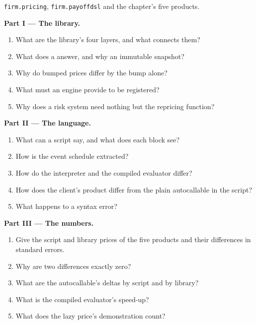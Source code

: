 \begin{problem}\label{pb:pl:pricing-library-architecture:1}
\texttt{firm.pricing}, \texttt{firm.payoffdsl} and the chapter's five products.

\medskip\noindent\textbf{Part I --- The library.}
\begin{enumerate}
\item What are the library's four layers, and what connects them?
\item What does a  answer, and why an immutable snapshot?
\item Why do bumped prices differ by the bump alone?
\item What must an engine provide to be registered?
\item Why does a risk system need nothing but the repricing function?
\end{enumerate}

\medskip\noindent\textbf{Part II --- The language.}
\begin{enumerate}[resume]
\item What can a script say, and what does each block see?
\item How is the event schedule extracted?
\item How do the interpreter and the compiled evaluator differ?
\item How does the client's product differ from the plain autocallable in the script?
\item What happens to a syntax error?
\end{enumerate}

\medskip\noindent\textbf{Part III --- The numbers.}
\begin{enumerate}[resume]
\item Give the script and library prices of the five products and their differences in standard errors.
\item Why are two differences exactly zero?
\item What are the autocallable's deltas by script and by library?
\item What is the compiled evaluator's speed-up?
\item What does the lazy price's demonstration count?
\end{enumerate}


\end{problem}

